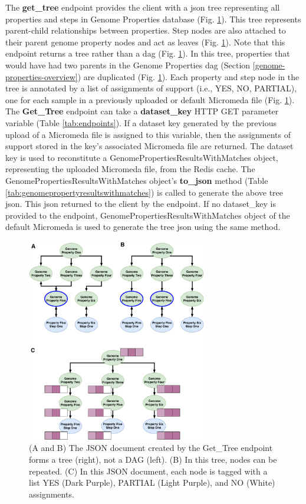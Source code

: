 The \textbf{get\_tree} endpoint provides the client with a \gls{json} tree representing all properties and steps in Genome Properties database (Fig. \ref{fig:tree-json}). This tree represents parent-child relationships between properties. Step nodes are also attached to their parent genome property nodes and act as leaves (Fig. \ref{fig:tree-json}). Note that this endpoint returns a tree rather than a \gls{dag} (Fig. \ref{fig:tree-json}). In this tree, properties that would have had two parents in the Genome Properties \gls{dag} (Section \ref{genome-properties-overview}) are duplicated (Fig. \ref{fig:tree-json}). Each property and step node in the tree is annotated by a list of assignments of support (i.e., YES, NO, PARTIAL), one for each sample in a previously uploaded or default Micromeda file (Fig. \ref{fig:tree-json}). The \textbf{Get\_Tree} endpoint can take a \textbf{dataset\_key} HTTP GET parameter variable (Table \ref{tab:endpoints}). If a dataset key generated by the previous upload of a Micromeda file is assigned to this variable, then the assignments of support stored in the key's associated Micromeda file are returned. The dataset key is used to reconstitute a GenomePropertiesResultsWithMatches object, representing the uploaded Micromeda file, from the Redis cache. The GenomePropertiesResultsWithMatches object's \textbf{to\_json} method (Table \ref{tab:genomepropertyresultswithmatches}) is called to generate the above tree \gls{json}. This \gls{json} returned to the client by the endpoint. If no dataset\_key is provided to the endpoint, GenomePropertiesResultsWithMatches object of the default Micromeda is used to generate the tree \gls{json} using the same method.

\begin{figure}[!ht]
  \centering
	\includegraphics[width=0.70\textwidth]{media/Tree-JSON.pdf}
	 \caption{(A and B) The JSON document created by the Get\_Tree endpoint forms a tree (right), not a DAG (left). (B) In this tree, nodes can be repeated. (C) In this JSON document, each node is tagged with a list YES (Dark Purple), PARTIAL (Light Purple), and NO (White) assignments.}
	 \label{fig:tree-json}
\end{figure}


